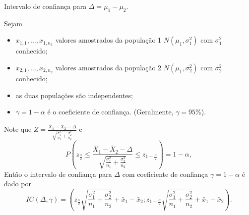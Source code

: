 \documentclass[9pt]{beamer}
\begin{document}
\begin{frame}{Intervalo de confiança para $\Delta = \mu_1-\mu_2$.}

\small

Sejam
\begin{itemize}
	\item $x_{1,1}, \dots, x_{1,n_1}$ valores amostrados da população 1 $N(\mu_1, \sigma_1^2)$ com $\sigma_1^2$ conhecido;
	\item $x_{2,1}, \dots, x_{2,n_2}$ valores amostrados da população 2 $N(\mu_1, \sigma_2^2)$ com $\sigma_2^2$ conhecido;
	\item as duas populações são independentes;
	\item $\gamma=1-\alpha$ é o coeficiente de confiança. (Geralmente, $\gamma=95\%$).
\end{itemize}

Note que $Z = \frac{\bar{X}_1 - \bar{X}_2 - \Delta}{\sqrt{ \frac{\sigma_1^2}{n_1} + \frac{\sigma_2^2}{n_2} }}$ e 
$$P\left( z_\frac{\alpha}{2} \leq \frac{\bar{X}_1 - \bar{X}_2 - \Delta}{\sqrt{ \frac{\sigma_1^2}{n_1} + \frac{\sigma_2^2}{n_2} }} \leq z_{1-\frac{\alpha}{2}} \right) = 1 - \alpha,$$
Então o intervalo de confiança para $\Delta$ com coeficiente de confiança $\gamma=1-\alpha$ é dado por
$$IC(\Delta, \gamma) = \left( z_{\frac{\alpha}{2}} \sqrt{\frac{\sigma_1^2}{n_1} + \frac{\sigma_2^2}{n_2}} + \bar{x}_1 - \bar{x}_2; z_{1-\frac{\alpha}{2}} \sqrt{\frac{\sigma_1^2}{n_1} + \frac{\sigma_2^2}{n_2}} + \bar{x}_1 - \bar{x}_2 \right).$$

\normalsize
\end{frame}
\end{document}
